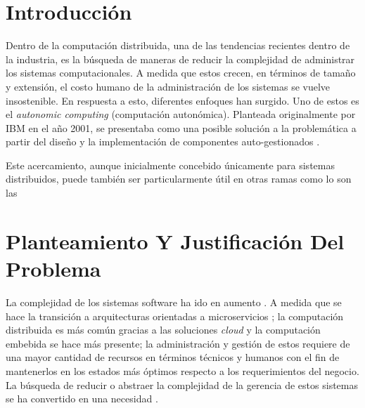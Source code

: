 \documentclass[12pt]{article}
\begin{document}
    
    
    \section{Introducción}


    Dentro de la computación distribuida, una de las tendencias recientes dentro de la industria, es la búsqueda de maneras de reducir la complejidad de administrar los sistemas computacionales. A medida que estos crecen, en términos de tamaño y extensión, el costo humano de la administración de los sistemas se vuelve insostenible. En respuesta a esto, diferentes enfoques han surgido. Uno de estos es el \textit{autonomic computing} (computación autonómica). Planteada originalmente por IBM en el año 2001, se presentaba como una posible solución a la problemática a partir del diseño y la implementación de componentes auto-gestionados \cite{jeff_2011}. 


    Este acercamiento, aunque inicialmente concebido únicamente para sistemas distribuidos, puede también ser particularmente útil en otras ramas como lo son las 


    \section{Planteamiento Y Justificación Del Problema}
    
    La complejidad de los sistemas software ha ido en aumento \cite[pp.~4-5]{horn_2001}. A medida que se hace la transición a arquitecturas orientadas a microservicios \cite{forrester_research_2019}; la computación distribuida es más común gracias a las soluciones \textit{cloud} \cite{the_cloud_in_2021} y la computación embebida se hace más presente\cite{deichmann_2022}; la administración y gestión de estos requiere de una mayor cantidad de recursos en términos técnicos y humanos con el fin de mantenerlos en los estados más óptimos respecto a los requerimientos del negocio. La búsqueda de reducir o abstraer la complejidad de la gerencia de estos sistemas se ha convertido en una necesidad \cite{lalanda_diaconescu_mccann_2014}.
    
\end{document}

